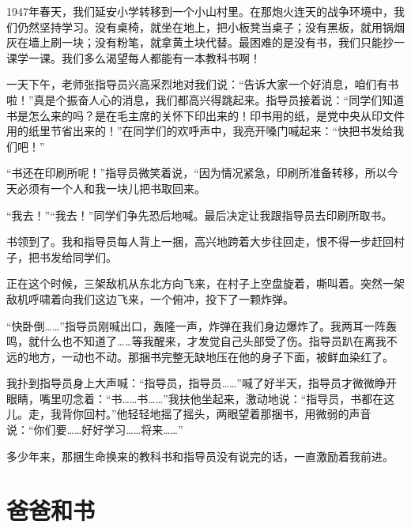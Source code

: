 \documentclass[12pt,UTF-8,openany]{ctexbook}
\begin{document}
\begin{large}
    
    1947年春天，我们延安小学转移到一个小山村里。在那炮火连天的战争环境中，我们仍然坚持学习。没有桌椅，就坐在地上，把小板凳当桌子；没有黑板，就用锅烟灰在墙上刷一块；没有粉笔，就拿黄土块代替。最困难的是没有书，我们只能抄一课学一课。我们多么渴望每人都能有一本教科书啊！
    
    一天下午，老师张指导员兴高采烈地对我们说：“告诉大家一个好消息，咱们有书啦！”真是个振奋人心的消息，我们都高兴得跳起来。指导员接着说：“同学们知道书是怎么来的吗？是在毛主席的关怀下印出来的！印书用的纸，是党中央从印文件用的纸里节省出来的！”在同学们的欢呼声中，我亮开嗓门喊起来：“快把书发给我们吧！”
    
    “书还在印刷所呢！”指导员微笑着说，“因为情况紧急，印刷所准备转移，所以今天必须有一个人和我一块儿把书取回来。
    
    “我去！”“我去！”同学们争先恐后地喊。最后决定让我跟指导员去印刷所取书。
    
    书领到了。我和指导员每人背上一捆，高兴地跨着大步往回走，恨不得一步赶回村子，把书发给同学们。
    
    正在这个时候，三架敌机从东北方向飞来，在村子上空盘旋着，嘶叫着。突然一架敌机呼啸着向我们这边飞来，一个俯冲，投下了一颗炸弹。
    
    “快卧倒……”指导员刚喊出口，轰隆一声，炸弹在我们身边爆炸了。我两耳一阵轰鸣，就什么也不知道了……等我醒来，才发觉自己头部受了伤。指导员趴在离我不远的地方，一动也不动。那捆书完整无缺地压在他的身子下面，被鲜血染红了。
    
    我扑到指导员身上大声喊：“指导员，指导员……”喊了好半天，指导员才微微睁开眼睛，嘴里叨念着：“书……书……”我扶他坐起来，激动地说：“指导员，书都在这儿。走，我背你回村。”他轻轻地摇了摇头，两眼望着那捆书，用微弱的声音说：“你们要……好好学习……将来……”
    
    多少年来，那捆生命换来的教科书和指导员没有说完的话，一直激励着我前进。
    
\end{large}



\chapter{爸爸和书}
\end{document}
